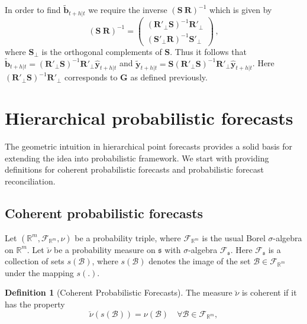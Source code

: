 \documentclass[12pt]{article}
\theoremstyle{definition}
\newtheorem{definition}{Definition}[section]
\begin{document}
In order to find $\tilde{\bm{b}}_{t+h|t}$ we require the inverse $(\bm{S} ~ \bm{R})^{-1}$ which is given by
\begin{equation}
(\bm{S} ~ \bm{R})^{-1} = \begin{pmatrix}
(\bm{R}'_\bot \bm{S})^{-1}\bm{R}'_\bot \\ (\bm{S}'_\bot \bm{R})^{-1}\bm{S}'_\bot
\end{pmatrix}\,,
\end{equation}
where $\bm{S}_{\bot}$ is the orthogonal complements of $\bm{S}$. Thus it follows that $\tilde{\bm{b}}_{t+h|t}=(\bm{R}'_\bot \bm{S})^{-1}\bm{R}'_\bot \hat{\bm{y}}_{t+h|t}$ and $\tilde{\bm{y}}_{t+h|t}=\bm{S}(\bm{R}'_\bot \bm{S})^{-1}\bm{R}'_\bot \hat{\bm{y}}_{t+h|t}$. Here $(\bm{R}'_\bot \bm{S})^{-1}\bm{R}'_\bot$ corresponds to $\bm{G}$ as defined previously.

\section{Hierarchical probabilistic forecasts}\label{sec:ProbForecasts}

The geometric intuition in hierarchical point forecasts provides a solid basis for extending the idea into probabilistic framework. We start with providing definitions for coherent probabilistic forecasts and probabilistic forecast reconciliation. 

\subsection{Coherent probabilistic forecasts}\label{subsec:cohprobf}

Let $(\mathbb{R}^m, \mathscr{F}_{\mathbb{R}^m}, \nu)$ be a probability triple, where $\mathscr{F}_{\mathbb{R}^m}$ is the usual Borel $\sigma$-algebra on $\mathbb{R}^m$. Let $\breve{\nu}$ be a probability measure on $\mathfrak{s}$ with $\sigma$-algebra $\mathscr{F}_{\mathfrak{s}}$. Here $\mathscr{F}_{\mathfrak{s}}$ is a collection of sets $s(\mathcal{B})$, where $s(\mathcal{B})$ denotes the image of the set $\mathcal{B}\in \mathscr{F}_{\mathbb{R}^m}$ under the mapping $s(.)$.

\begin{definition}[Coherent Probabilistic Forecasts]\label{def:cohprob}
  The measure $\breve{\nu}$ is coherent if it has the property
  \[
    \breve{\nu}(s(\mathcal{B})) = \nu(\mathcal{B}) \quad \forall \mathcal{B} \in \mathscr{F}_{\mathbb{R}^m},
  \]
\end{definition}
\end{document}
